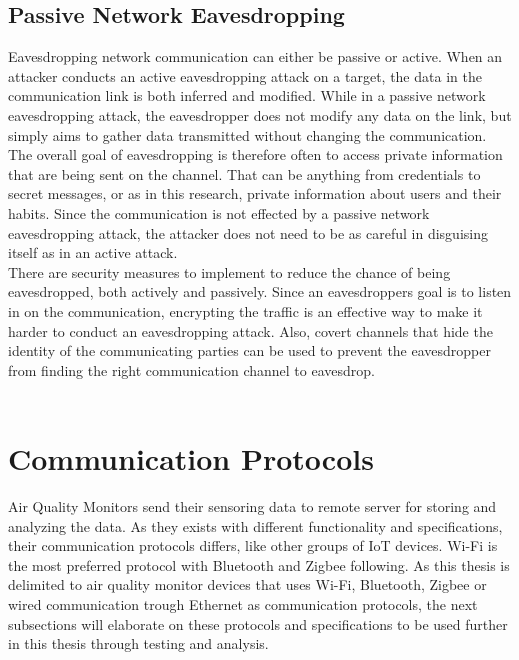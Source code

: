 \subsection{Passive Network Eavesdropping}
Eavesdropping network communication can either be passive or active. When an attacker conducts an active eavesdropping attack on a target, the data in the communication link is both inferred and modified. \cite{Eavesdropping} While in a passive network eavesdropping attack, the eavesdropper does not modify any data on the link, but simply aims to gather data transmitted without changing the communication. The overall goal of eavesdropping is therefore often to access private information that are being sent on the channel. That can be anything from credentials to secret messages, or as in this research, private information about users and their habits. \cite{Eavesdropping} Since the communication is not effected by a passive network eavesdropping attack, the attacker does not need to be as careful in disguising itself as in an active attack.  
\\
There are security measures to implement to reduce the chance of being eavesdropped, both actively and passively. Since an eavesdroppers goal is to listen in on the communication, encrypting the traffic is an effective way to make it harder to conduct an eavesdropping attack. Also, covert channels that hide the identity of the communicating parties can be used to prevent the eavesdropper from finding the right communication channel to eavesdrop. \cite{Eavesdropping}
\\\\
\section{Communication Protocols}
Air Quality Monitors send their sensoring data to remote server for storing and analyzing the data. As they exists with different functionality and specifications, their communication protocols differs, like other groups of IoT devices. \cite{AQMBigSource} Wi-Fi is the most preferred protocol with Bluetooth and Zigbee following. \cite{saini2020indoor} As this thesis is delimited to air quality monitor devices that uses Wi-Fi, Bluetooth, Zigbee or wired communication trough Ethernet as communication protocols, the next subsections will elaborate on these protocols and specifications to be used further in this thesis through testing and analysis. 

